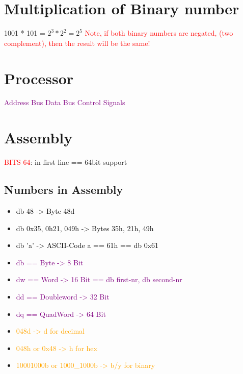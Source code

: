 \documentclass[main.tex,fontsize=8pt,paper=a4,paper=landscape,DIV=calc,]{scrartcl}
\begin{document}
\begin{multicols*}{4}


\section{Multiplication of Binary number}
1001 * 101 = \(2^3 * 2^2 = 2^5\)\newline
\textcolor{red}{Note, if both binary numbers are negated, (two complement), then the result will be the same!}

\section{Processor}
\textcolor{purple}{Address Bus}\newline
\textcolor{purple}{Data Bus}\newline
\textcolor{purple}{Control Signals}

\section{Assembly}
\textcolor{red}{BITS 64}: in first line == 64bit support

\subsection{Numbers in Assembly}
\begin{itemize}
\item \textcolor{black}{db 48 -> Byte 48d}
\item \textcolor{black}{db 0x35, 0h21, 049h -> Bytes 35h, 21h, 49h}
\item \textcolor{black}{db 'a' -> ASCII-Code a == 61h == db 0x61}
\item \textcolor{purple}{db == Byte -> 8 Bit}
\item \textcolor{purple}{dw == Word -> 16 Bit == db first-nr, db second-nr}
\item \textcolor{purple}{dd == Doubleword -> 32 Bit}
\item \textcolor{purple}{dq == QuadWord -> 64 Bit}
\item \textcolor{orange}{048d -> d for decimal}
\item \textcolor{orange}{048h or 0x48 -> h for hex}
\item \textcolor{orange}{10001000b or 1000\_1000b -> b/y for binary}
\end{itemize}

\end{multicols*}
\end{document}
